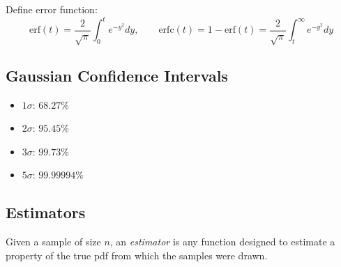 Define error function:
\[
    \text{erf}(t) = \frac{2}{\sqrt{\pi}} \int_0^t e^{-y^2} dy,
    \qquad
    \text{erfc}(t) = 1 - \text{erf}(t) = \frac{2}{\sqrt{\pi}} \int_t^\infty e^{-y^2} dy
\]

\subsection{Gaussian Confidence Intervals}
\begin{itemize}
    \item $1\sigma$: $68.27\%$
    \item $2\sigma$: $95.45\%$
    \item $3\sigma$: $99.73\%$
    \item $5\sigma$: $99.99994\%$
\end{itemize}

\subsection{Estimators}
Given a sample of size $n$, an \emph{estimator} is any function designed to estimate a property of the true pdf from which the samples were drawn.
